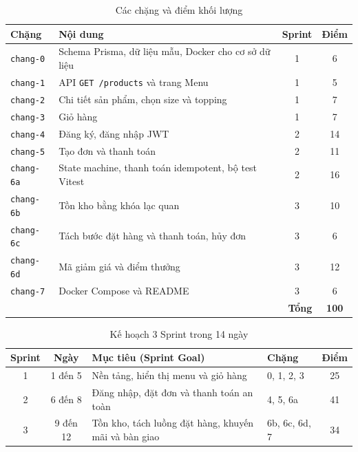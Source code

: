 \documentclass[a4paper]{article}
\begin{document}
\begin{table}[h!]
\centering
\footnotesize
\begin{tabularx}{\textwidth}{|l|X|c|c|}
\hline
\textbf{Chặng} & \textbf{Nội dung} & \textbf{Sprint} & \textbf{Điểm} \\ \hline
\texttt{chang-0} & Schema Prisma, dữ liệu mẫu, Docker cho cơ sở dữ liệu & 1 & 6 \\ \hline
\texttt{chang-1} & API \texttt{GET /products} và trang Menu & 1 & 5 \\ \hline
\texttt{chang-2} & Chi tiết sản phẩm, chọn size và topping & 1 & 7 \\ \hline
\texttt{chang-3} & Giỏ hàng & 1 & 7 \\ \hline
\texttt{chang-4} & Đăng ký, đăng nhập JWT & 2 & 14 \\ \hline
\texttt{chang-5} & Tạo đơn và thanh toán & 2 & 11 \\ \hline
\texttt{chang-6a} & State machine, thanh toán idempotent, bộ test Vitest & 2 & 16 \\ \hline
\texttt{chang-6b} & Tồn kho bằng khóa lạc quan & 3 & 10 \\ \hline
\texttt{chang-6c} & Tách bước đặt hàng và thanh toán, hủy đơn & 3 & 6 \\ \hline
\texttt{chang-6d} & Mã giảm giá và điểm thưởng & 3 & 12 \\ \hline
\texttt{chang-7} & Docker Compose và README & 3 & 6 \\ \hline
\multicolumn{3}{|r|}{\textbf{Tổng}} & \textbf{100} \\ \hline
\end{tabularx}
\caption{Các chặng và điểm khối lượng}
\end{table}

\begin{table}[h!]
\centering
\footnotesize
\begin{tabularx}{\textwidth}{|c|c|X|l|c|}
\hline
\textbf{Sprint} & \textbf{Ngày} & \textbf{Mục tiêu (Sprint Goal)} & \textbf{Chặng} & \textbf{Điểm} \\ \hline
1 & 1 đến 5 & Nền tảng, hiển thị menu và giỏ hàng & 0, 1, 2, 3 & 25 \\ \hline
2 & 6 đến 8 & Đăng nhập, đặt đơn và thanh toán an toàn & 4, 5, 6a & 41 \\ \hline
3 & 9 đến 12 & Tồn kho, tách luồng đặt hàng, khuyến mãi và bàn giao & 6b, 6c, 6d, 7 & 34 \\ \hline
\end{tabularx}
\caption{Kế hoạch 3 Sprint trong 14 ngày}
\end{table}
\end{document}
